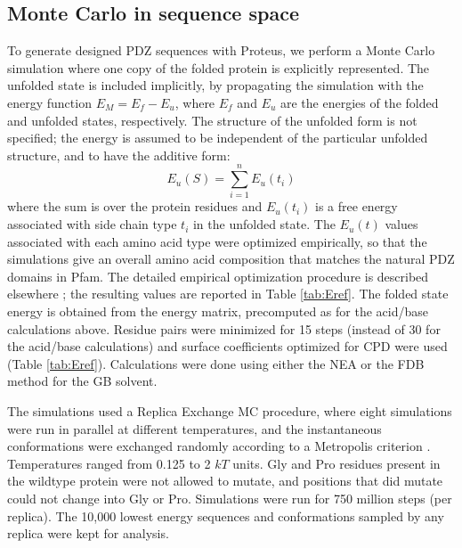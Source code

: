 \documentclass[a4paper,12pt]{article}
\begin{document}
\subsection{Monte Carlo in sequence space}
To generate designed PDZ sequences with Proteus, we perform a Monte Carlo simulation where one copy of the folded protein
is explicitly represented. The unfolded state is included implicitly, by propagating the simulation with the energy function
$E_M = E_f - E_u$, where $E_f$ and $E_u$ are the energies of the folded and unfolded states, respectively. The structure
of the unfolded form is not specified; the energy is assumed to be independent of the particular unfolded structure,
and to have the additive form:
\begin{equation}  \label{eq:unfolded}
E_u(S) = \sum_{i=1}^n E_u(t_i)
\end{equation}
where the sum is over the protein residues and $E_u(t_i)$ is a free energy associated with side chain type $t_i$ in
the unfolded state. The $E_u(t)$ values associated with each amino acid type were optimized empirically, so that the
simulations give an overall amino acid composition that matches the natural PDZ domains in Pfam. The detailed
empirical optimization procedure is described elsewhere \cite{Mignon17}; the resulting values are reported in Table
\ref{tab:Eref}. The folded state energy is obtained from the energy matrix, precomputed as for the acid/base calculations
above. Residue pairs were minimized for 15 steps (instead of 30 for the acid/base calculations) and surface coefficients
optimized for CPD were used (Table \ref{tab:Eref}). Calculations were done using either the NEA or the FDB method for
the GB solvent. 

The simulations used a Replica Exchange MC procedure, where eight simulations were run in parallel at different temperatures,
and the instantaneous conformations were exchanged randomly according to a Metropolis criterion \cite{Mignon16}. Temperatures
ranged from 0.125 to 2 $kT$ units. Gly and Pro residues present in the wildtype protein were not allowed to mutate, and positions
that did mutate could not change into Gly or Pro. Simulations were run for 750 million steps (per replica). The 10,000 lowest
energy sequences and conformations sampled by any replica were kept for analysis. 
\end{document}
